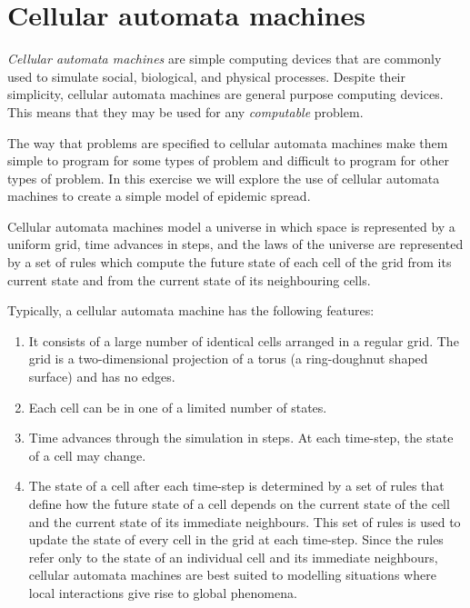 \documentclass[12pt,a4paper]{book}
\theoremstyle{definition}
\theoremstyle{definition}
\theoremstyle{definition}
\theoremstyle{remark}
\begin{document}
\hypertarget{cellular-automata-machines}{%
\section{Cellular automata machines}\label{cellular-automata-machines}}

\emph{Cellular automata machines} are simple computing devices that are
commonly used to simulate social, biological, and physical processes.
Despite their simplicity, cellular automata machines are general purpose
computing devices. This means that they may be used for any
\emph{computable} problem.

The way that problems are specified to cellular automata machines make
them simple to program for some types of problem and difficult to
program for other types of problem. In this exercise we will explore the
use of cellular automata machines to create a simple model of epidemic
spread.

Cellular automata machines model a universe in which space is
represented by a uniform grid, time advances in steps, and the laws of
the universe are represented by a set of rules which compute the future
state of each cell of the grid from its current state and from the
current state of its neighbouring cells.

Typically, a cellular automata machine has the following features:

\begin{enumerate}
\def\labelenumi{\arabic{enumi}.}
\item
  It consists of a large number of identical cells arranged in a regular
  grid. The grid is a two-dimensional projection of a torus (a
  ring-doughnut shaped surface) and has no edges.
\item
  Each cell can be in one of a limited number of states.
\item
  Time advances through the simulation in steps. At each time-step, the
  state of a cell may change.
\item
  The state of a cell after each time-step is determined by a set of
  rules that define how the future state of a cell depends on the
  current state of the cell and the current state of its immediate
  neighbours. This set of rules is used to update the state of every
  cell in the grid at each time-step. Since the rules refer only to the
  state of an individual cell and its immediate neighbours, cellular
  automata machines are best suited to modelling situations where local
  interactions give rise to global phenomena.
\end{enumerate}
\end{document}
